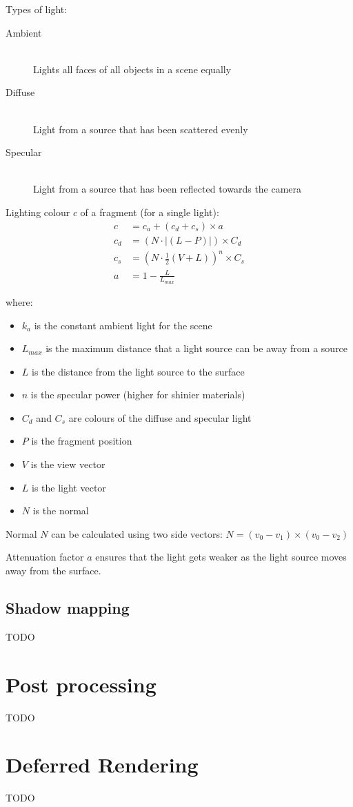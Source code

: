 \documentclass[a4paper]{article}
\begin{document}
Types of light:

\begin{description}
  \item[Ambient] \hfill \\
    Lights all faces of all objects in a scene equally
  \item[Diffuse] \hfill \\
    Light from a source that has been scattered evenly
  \item[Specular] \hfill \\
    Light from a source that has been reflected towards the camera
\end{description}

Lighting colour $c$ of a fragment (for a single light):
\begin{align*}
  c &= c_{a} + (c_{d} + c_{s}) \times a \\
  c_{d} &= (N \cdot |(L - P)|) \times C_{d} \\
  c_{s} &= (N \cdot \frac{1}{2}(V + L))^{n} \times C_{s}\\
  a &= 1 - \frac{L}{L_{max}}
\end{align*}

where:

\begin{itemize}
  \item $k_{a}$ is the constant ambient light for the scene
  \item $L_{max}$ is the maximum distance that a light source can be away from a
    source
  \item $L$ is the distance from the light source to the surface
  \item $n$ is the specular power (higher for shinier materials)
  \item $C_{d}$ and $C_{s}$ are colours of the diffuse and specular light
  \item $P$ is the fragment position
  \item $V$ is the view vector
  \item $L$ is the light vector
  \item $N$ is the normal
\end{itemize}

Normal $N$ can be calculated using two side vectors: $N = (v_{0} - v_{1}) \times
(v_{0} - v_{2})$

Attenuation factor $a$ ensures that the light gets weaker as the light source
moves away from the surface.

\subsection{Shadow mapping}

TODO

\section{Post processing}

TODO

\section{Deferred Rendering}

TODO
\end{document}
